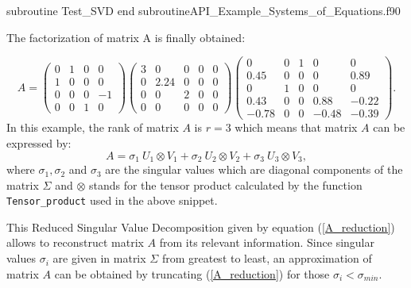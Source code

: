     \vspace{0.5cm} 
    {subroutine Test_SVD}
    {end subroutine}{API_Example_Systems_of_Equations.f90}
    
The factorization of matrix A is finally obtained: 

$$
        A =
    	\begin{pmatrix}
    	    	0 & 1 & 0 & 0  \\
    	    	1 & 0 & 0 & 0  \\
    	    	0 & 0 & 0 & -1  \\
    	    	0 & 0 & 1 & 0 
    	\end{pmatrix}
    	\begin{pmatrix}
    	 	   	3 & 0 & 0 & 0 & 0 \\
    	  	   	0 & 2.24 & 0 & 0 & 0 \\
    	       	0 & 0 & 2 & 0 & 0 \\
    	       	0 & 0 & 0 & 0 & 0
    	\end{pmatrix} 
    	\begin{pmatrix}
    	 	   	0 & 0 & 1 & 0 & 0 \\
    	  	   	0.45 & 0 & 0 & 0 & 0.89 \\
    	       	0 & 1 & 0 & 0 & 0 \\
    	       	0.43 & 0 & 0 & 0.88 & -0.22  \\
    	       	-0.78 & 0 & 0 & -0.48 & -0.39
    	\end{pmatrix}.  
$$    
In this example, the rank of matrix $ A $ is $ r = 3 $ which means that matrix $ A $ 
can be expressed by: 
\begin{equation} 
A = \sigma_1 \  U_1 \otimes V_1 + \sigma_2 \ U_2 \otimes V_2 + \sigma_3 \ U_3 \otimes V_3, 
\label{A_reduction}
\end{equation}
where $ \sigma_1, \sigma_2 $ and $\sigma_3 $ are the singular values which are diagonal 
components of the matrix $ \Sigma $ and $ \otimes $ stands for the tensor product 
calculated by the  function \verb|Tensor_product| used in the above snippet.  

This Reduced Singular Value Decomposition given by equation (\ref{A_reduction})  allows to 
reconstruct matrix $ A $ from its relevant information. Since singular values $ \sigma_i $ are
given in matrix $ \Sigma $ from greatest to least, an approximation of matrix $ A $ 
can be obtained by truncating (\ref{A_reduction}) for those $ \sigma_i <  \sigma_{min}$. 



